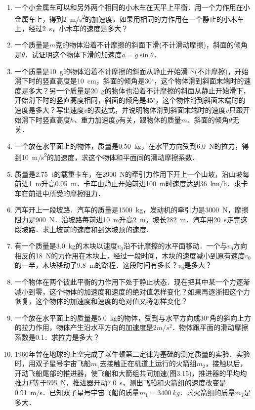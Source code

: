 \begin{exercises}
\begin{enumerate}
    \item 一个小金属车可以和另外两个相同的小木车在天平上平衡．用一个力作用在小金属车上，得到\SI{2}{m/s^2}的加速度，如果用相同的力作用在一个静止的小木车上，经过\SI{2}{s}，小木车的速度是多大？

    \item  一个质量是$m$克的物体沿着不计摩擦的斜面下滑(不计滑动摩擦)，斜面的倾角是$\theta$．试证明这个物体下滑的加速度$a=g\sin\theta$．
    \item   一个质量是\SI{10}{g}的物体沿着不计摩擦的斜面从静止开始滑下(不计摩擦)，开始滑下时的竖直高度是\SI{10}{cm}，斜面的倾角是30$^\circ$，这个物体滑到斜面末端时的速度是多大？另一个质量是\SI{20}{g}的物体也沿着不计摩擦的斜面从静止开始滑下，开始滑下时的竖直高度相同，斜面的倾角是45$^\circ$，这个物体滑到斜面末端时的速度是多大？写出速度$v$的表达式，并说明物体滑到斜面末端时的速度$v$只跟开始滑下时竖直高度$h$、重力加速度$g$有关，跟物休的质量$m$、斜面的倾角$\theta$无关．
    \item 一个放在水平面上的物体，质量是\SI{0.50}{kg}，在水平方向受到\SI{6.0}{N}的拉力，得到\SI{10}{m/s^2}的加速度，求这个物体和平面间的滑动摩擦系数．
    \item 质量是\SI{2.75}{t}的载重卡车，在\SI{2900}{N}的牵引力作用下开上一个山坡，沿山坡每前进\SI{1}{m}升高\SI{0.05}{m}．卡车由静止开始前进\SI{100}{m}时速度达到\SI{36}{km/h}．求卡车在前进中所受的摩擦阻力．
    \item 汽车开上一段坡路．汽车的质量是\SI{1500}{kg}，发动机的牵引力是\SI{3000}{N}，摩擦阻力是\SI{900}{N}．沿坡路每前进\SI{10}{m}升高\SI{2}{m}，坡长\SI{282}{m}．汽车用\SI{20}{s}走完这段坡路．求上坡前的速度和到达坡顶的速度．
    \item   有一个质量是\SI{3.0}{kg}的木块以速度$v_0$沿不计摩擦的水平面移动．一个与$v_0$方向相反的\SI{18}{N}的力作用在木块上，经过一段时间，木块的速度减小到原有速度$v_0$的一半，木块移动了\SI{9.8}{m}的路程．这段时间有多长？$v_0$是多大？
    \item   一个物体在两个彼此平衡的力作用下处于静止状态．现在把其中某一个力逐渐减小到零，这个物体的加速度和速度的绝对值怎样变化？如果再逐浙把这个力恢复，这个物体的加速度和速度的绝对值又将怎样变化？
    \item   一个放在水平面上的质量是\SI{5.0}{kg}的物体，受到与水平方向成30$^{\circ}$角的斜向上方的拉力作用，物体产生沿水平方向的加速度是2$\si{m/s^2}$．物体跟平面的滑动摩擦系数是0.1．求拉力是多大？
    \item  1966年曾在地球的上空完成了以牛顿第二定律为基础的测定质量的实验．实验时，用双子星号宇宙飞船$m_1$去接触正在机道上运行的火箭组$m_2$，接触以后，开动飞船尾部的推进器，使飞船和大箭组共同加速(图3.15)，推进器的平均均推力$F$等于\SI{595}{N}，推进器开动\SI{7.0}{s}，测出飞船和火箭组的速度改变是\SI{0.91}{m/s}．已知双子星号宇宙飞船的质量$m_1=\SI{3400}{kg}$．求火箭组的质量$m_2$是多大．

\end{enumerate}
\end{exercises}
